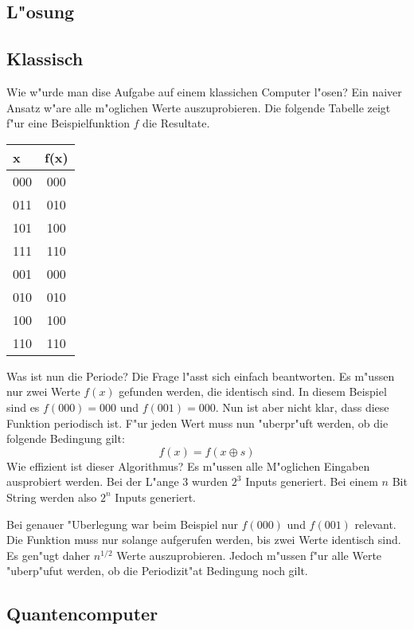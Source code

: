 \begin{refsection}
\section{L"osung}

\subsection{Klassisch}

Wie w"urde man dise Aufgabe auf einem klassichen Computer l"osen? Ein naiver
Ansatz w"are alle m"oglichen Werte auszuprobieren. Die folgende Tabelle zeigt
f"ur eine Beispielfunktion $f$ die Resultate.
\begin{center}
   \begin{tabular}{ l | c  }
    \hline
     x   & f(x) \\ \hline
     000 & 000  \\ \hline
     011 & 010  \\ \hline
     101 & 100  \\ \hline
     111 & 110  \\ \hline
     001 & 000  \\ \hline
     010 & 010  \\ \hline
     100 & 100  \\ \hline
     110 & 110  \\ \hline
     \hline
    \end{tabular}
\end{center}
Was ist nun die Periode? Die Frage l"asst sich einfach beantworten. Es m"ussen
nur zwei Werte $f(x)$ gefunden werden, die identisch sind. In diesem Beispiel
sind es $f(000) = 000$ und $f(001) = 000$. 
Nun ist aber nicht klar, dass diese Funktion periodisch ist. F"ur jeden Wert
muss nun "uberpr"uft werden, ob die folgende Bedingung gilt:
\[
    f(x) = f(x \oplus s) 
\]
Wie effizient ist dieser Algorithmus? Es m"ussen alle M"oglichen Eingaben
ausprobiert werden. Bei der L"ange $3$ wurden $2^3$ Inputs generiert. Bei einem
$n$ Bit String werden also $2^n$ Inputs generiert. 

Bei genauer "Uberlegung war beim Beispiel nur $f(000)$ und $f(001)$ relevant.
Die Funktion muss nur solange aufgerufen werden, bis zwei Werte identisch sind.
Es gen"ugt daher $n^{1/2}$ Werte auszuprobieren. 
Jedoch m"ussen f"ur alle Werte "uberp"ufut werden, ob die Periodizit"at Bedingung
noch gilt.

\subsection{Quantencomputer}


\end{refsection}
